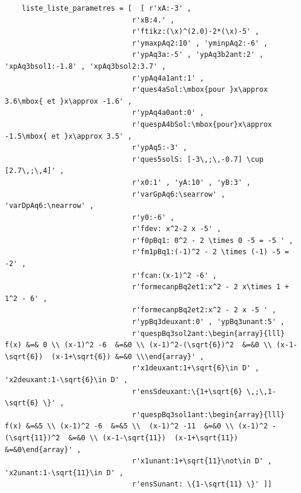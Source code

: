 {\begin{verbatim}
    liste_liste_parametres = [  [ r'xA:-3' , 
                              r'xB:4.' , 
                              r'ftikz:(\x)^(2.0)-2*(\x)-5' , 
                              r'ymaxpAq2:10' , 'yminpAq2:-6' , 
                              r'ypAq3a:-5' , 'ypAq3b2ant:2' , 'xpAq3bsol1:-1.8' , 'xpAq3bsol2:3.7' ,
                              r'ypAq4a1ant:1' , 
                              r'ques4aSol:\mbox{pour }x\approx 3.6\mbox{ et }x\approx -1.6' , 
                              r'ypAq4a0ant:0' , 
                              r'quespA4bSol:\mbox{pour}x\approx -1.5\mbox{ et }x\approx 3.5' , 
                              r'ypAq5:-3' , 
                              r'ques5solS: [-3\,;\,-0.7] \cup  [2.7\,;\,4]' , 
                              r'x0:1' , 'yA:10' , 'yB:3' , 
                              r'varGpAq6:\searrow' , 'varDpAq6:\nearrow' , 
                              r'y0:-6' , 
                              r'fdev: x^2-2 x -5' , 
                              r'f0pBq1: 0^2 - 2 \times 0 -5 = -5 ' , 
                              r'fm1pBq1:(-1)^2 - 2 \times (-1) -5 = -2' , 
                              r'fcan:(x-1)^2 -6' , 
                              r'formecanpBq2et1:x^2 - 2 x\times 1 + 1^2 - 6' , 
                              r'formecanpBq2et2:x^2 - 2 x -5 ' , 
                              r'ypBq3deuxant:0' , 'ypBq3unant:5' , 
                              r'quespBq3sol2ant:\begin{array}{lll} f(x) &=& 0 \\ (x-1)^2 -6  &=&0 \\ (x-1)^2-(\sqrt{6})^2  &=&0 \\ (x-1-\sqrt{6})  (x-1+\sqrt{6}) &=&0 \\\end{array}' , 
                              r'x1deuxant:1+\sqrt{6}\in D' , 'x2deuxant:1-\sqrt{6}\in D' , 
                              r'ensSdeuxant:\{1+\sqrt{6} \,;\,1-\sqrt{6} \}' , 
                              r'quespBq3sol1ant:\begin{array}{lll} f(x) &=&5 \\ (x-1)^2 -6  &=&5 \\  (x-1)^2 -11  &=&0 \\ (x-1)^2 -(\sqrt{11})^2  &=&0 \\ (x-1-\sqrt{11})  (x-1+\sqrt{11}) &=&0\end{array}' ,
                              r'x1unant:1+\sqrt{11}\not\in D' , 'x2unant:1-\sqrt{11}\in D' , 
                              r'ensSunant: \{1-\sqrt{11} \}' ]] 
\end{verbatim} 


}
